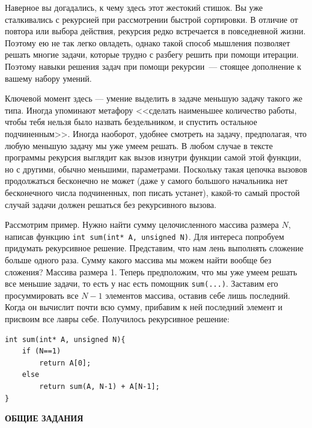 \documentclass{article}
\begin{document}
Наверное вы догадались, к чему здесь этот жестокий стишок. Вы уже сталкивались с рекурсией при рассмотрении быстрой сортировки. В отличие от повтора или выбора действия, рекурсия редко встречается в повседневной жизни. Поэтому ею не так легко овладеть, однако такой способ мышления позволяет решать многие задачи, которые трудно с разбегу решить при помощи итерации. Поэтому навыки решения задач при помощи рекурсии~--- стоящее дополнение к вашему набору умений. 

Ключевой момент здесь --- умение выделить в задаче меньшую задачу такого же типа. Иногда упоминают метафору <<сделать наименьшее количество работы, чтобы тебя нельзя было назвать бездельником, и спустить остальное подчиненным>>. Иногда наоборот, удобнее смотреть на задачу, предполагая, что любую меньшую задачу мы уже умеем решать. В любом случае в тексте программы рекурсия выглядит как вызов изнутри функции самой этой функции, но с другими, обычно меньшими, параметрами. Поскольку такая цепочка вызовов продолжаться бесконечно не может (даже у самого большого начальника нет бесконечного числа подчиненных, поп писать устанет), какой-то самый простой случай задачи должен решаться без рекурсивного вызова.

Рассмотрим пример. Нужно найти сумму целочисленного массива размера $N$, написав функцию \texttt{int sum(int* A, unsigned N)}. Для интереса попробуем придумать рекурсивное решение. Представим, что нам лень выполнять сложение больше одного раза. Сумму какого массива мы можем найти вообще без сложения? Массива размера 1. Теперь предположим, что мы уже умеем решать все меньшие задачи, то есть у нас есть помощник \texttt{sum(...)}. Заставим его просуммировать все $N-1$ элементов массива, оставив себе лишь последний. Когда он вычислит почти всю сумму, прибавим к ней последний элемент и присвоим все лавры себе. Получилось рекурсивное решение:
\begin{verbatim}
int sum(int* A, unsigned N){
    if (N==1)
        return A[0];
    else
        return sum(A, N-1) + A[N-1];
}
\end{verbatim}






\newpage
\begin{center}
\textbf{ОБЩИЕ ЗАДАНИЯ}
\end{center}
\end{document}
